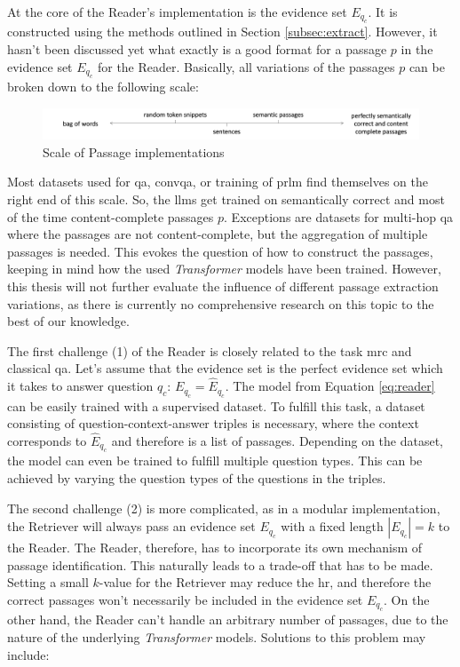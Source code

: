 At the core of the Reader's implementation is the evidence set $E_{q_c}$. It is constructed using the methods outlined in Section \ref{subsec:extract}. However, it hasn't been discussed yet what exactly is a good format for a passage $p$ in the evidence set $E_{q_c}$ for the Reader. Basically, all variations of the passages $p$ can be broken down to the following scale:

\begin{figure}[H]
    \centering
    \includegraphics[width=1\textwidth]{Grafiken/Scale_Passages.png}
    \caption{Scale of Passage implementations}
    \label{fig:scale-passages-implementation}
\end{figure}

Most datasets used for \gls{qa}, \gls{convqa}, or training of \gls{prlm} find themselves on the right end of this scale. So, the \gls{llm}s get trained on semantically correct and most of the time content-complete passages $p$. Exceptions are datasets for multi-hop \gls{qa} where the passages are not content-complete, but the aggregation of multiple passages is needed. This evokes the question of how to construct the passages, keeping in mind how the used \textit{Transformer} models have been trained. However, this thesis will not further evaluate the influence of different passage extraction variations, as there is currently no comprehensive research on this topic to the best of our knowledge.

The first challenge (1) of the Reader is closely related to the task \gls{mrc} and classical \gls{qa}. Let's assume that the evidence set is the perfect evidence set which it takes to answer question $q_c$: $E_{q_c} = \hat{E}_{q_c}$. The model from Equation \ref{eq:reader} can be easily trained with a supervised dataset. To fulfill this task, a dataset consisting of question-context-answer triples is necessary, where the context corresponds to $\hat{E}_{q_c}$ and therefore is a list of passages. Depending on the dataset, the model can even be trained to fulfill multiple question types. This can be achieved by varying the question types of the questions in the triples.

The second challenge (2) is more complicated, as in a modular implementation, the Retriever will always pass an evidence set $E_{q_c}$ with a fixed length $|E_{q_c}| = k$ to the Reader. The Reader, therefore, has to incorporate its own mechanism of passage identification. This naturally leads to a trade-off that has to be made. Setting a small $k$-value for the Retriever may reduce the \gls{hr}, and therefore the correct passages won't necessarily be included in the evidence set $E_{q_c}$. On the other hand, the Reader can't handle an arbitrary number of passages, due to the nature of the underlying \textit{Transformer} models. Solutions to this problem may include:


